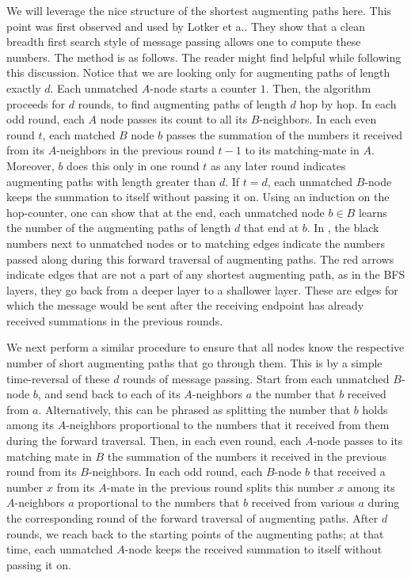\documentclass[11pt]{article}
\begin{document}
We will leverage the nice structure of the shortest augmenting paths here. This point was first observed and used by Lotker et a.\cite{lotkerMatchingImproved}. They show that a clean breadth first search style of message passing allows one to compute these numbers. The method is as follows. The reader might find  helpful while following this discussion. Notice that we are looking only for augmenting paths of length exactly $d$. Each unmatched $A$-node starts a counter $1$. Then, the algorithm proceeds for $d$ rounds, to find augmenting paths of length $d$ hop by hop. In each odd round, each $A$ node passes its count to all its $B$-neighbors. In each even round $t$, each matched $B$ node $b$ passes the summation of the numbers it received from its $A$-neighbors in the previous round $t-1$ to its matching-mate in $A$. Moreover, $b$ does this only in one round $t$ as any later round indicates augmenting paths with length greater than $d$.
If $t=d$, each unmatched $B$-node keeps the summation to itself without passing it on. Using an induction on the hop-counter, one can show that at the end, each unmatched node $b\in B$ learns the number of the augmenting paths of length $d$ that end at $b$. In , the black numbers next to unmatched nodes or to matching edges indicate the numbers passed along during this forward traversal of augmenting paths. The red arrows indicate edges that are not a part of any shortest augmenting path, as in the BFS layers, they go back from a deeper layer to a shallower layer. These are edges for which the message would be sent after the receiving endpoint has already received summations in the previous rounds.

We next perform a similar procedure to ensure that all nodes know the respective number of short augmenting paths that go through them. This is by a simple time-reversal of these $d$ rounds of message passing. Start from each unmatched $B$-node $b$, and send back to each of its $A$-neighbors $a$ the number that $b$ received from $a$. Alternatively, this can be phrased as splitting the number that $b$ holds among its $A$-neighbors proportional to the numbers that it received from them during the forward traversal. Then, in each even round, each $A$-node passes to its matching mate in $B$ the summation of the numbers it received in the previous round from its $B$-neighbors. In each odd round, each $B$-node $b$ that received a number $x$ from its $A$-mate in the previous round splits this number $x$ among its $A$-neighbors $a$ proportional to the numbers that $b$ received from various $a$ during the corresponding round of the forward traversal of augmenting paths. After $d$ rounds, we reach back to the starting points of the augmenting paths;  at that time, each unmatched $A$-node keeps the received summation to itself without passing it on.
\end{document}
